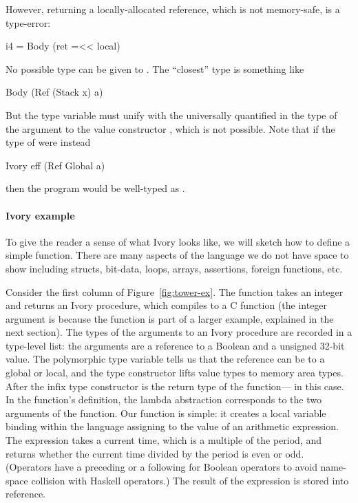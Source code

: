 However, returning a locally-allocated reference, which is not memory-safe, is a
type-error:
\begin{code}
i4 = Body (ret =<< local)
\end{code}
\noindent
No possible type can be given to .  The ``closest'' type is something
like
\begin{code}
Body (Ref (Stack x) a)
\end{code}
\noindent
But the type variable  must unify with the universally quantified
 in the type of the argument to the value constructor , which is
not possible.  Note that if the type of  were instead
\begin{code}
Ivory eff (Ref Global a)
\end{code}
\noindent
then the program  would be well-typed as .

\paragraph{Ivory example}
To give the reader a sense of what Ivory looks like, we will sketch how to
define a simple function.  There are many aspects of the language we do not have
space to show including structs, bit-data, loops, arrays, assertions, foreign
functions, etc.

Consider the first column of Figure~\ref{fig:tower-ex}.  The function takes an
integer and returns an Ivory procedure, which compiles to a C function (the
integer argument is because the function is part of a larger example, explained
in the next section).  The types of the arguments to an Ivory procedure are
recorded in a type-level list: the arguments are a reference to a Boolean and a
unsigned 32-bit value.  The polymorphic type variable  tells us that the
reference can be to a global or local, and the  type constructor
lifts value types to memory area types.  After the infix type constructor
\cd{:->} is the return type of the function--- in this case.  In the
function's definition, the lambda abstraction corresponds to the two arguments
of the function.  Our function is simple: it creates a local variable binding
within the language assigning to  the value of an arithmetic
expression.  The expression takes a current time, which is a multiple of the
period, and returns whether the current time divided by the period is even or
odd.  (Operators have a preceding  or a following  for Boolean
operators to avoid name-space collision with Haskell operators.)  The result of
the expression is stored into  reference.


